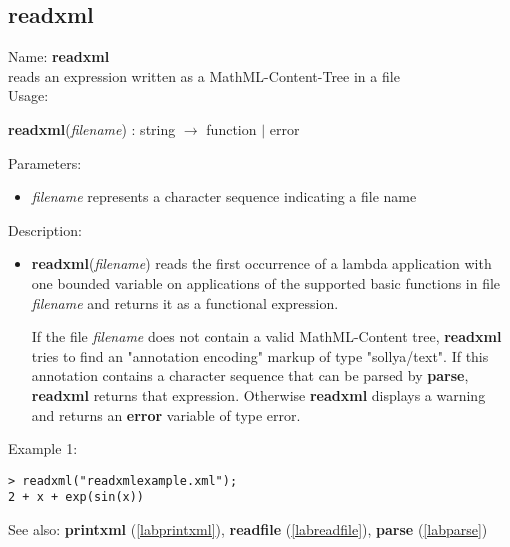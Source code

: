 \subsection{readxml}
\label{labreadxml}
\noindent Name: \textbf{readxml}\\
reads an expression written as a MathML-Content-Tree in a file\\
\noindent Usage: 
\begin{center}
\textbf{readxml}(\emph{filename}) : \textsf{string} $\rightarrow$ \textsf{function} $|$ \textsf{error}
\\ 
\end{center}
Parameters: 
\begin{itemize}
\item \emph{filename} represents a character sequence indicating a file name
\end{itemize}
\noindent Description: \begin{itemize}

\item \textbf{readxml}(\emph{filename}) reads the first occurrence of a lambda
   application with one bounded variable on applications of the supported
   basic functions in file \emph{filename} and returns it as a \sollya
   functional expression.
    
   If the file \emph{filename} does not contain a valid MathML-Content tree,
   \textbf{readxml} tries to find an "annotation encoding" markup of type
   "sollya/text". If this annotation contains a character sequence
   that can be parsed by \textbf{parse}, \textbf{readxml} returns that expression.  Otherwise
   \textbf{readxml} displays a warning and returns an \textbf{error} variable of type
   \textsf{error}.
\end{itemize}
\noindent Example 1: 
\begin{center}\begin{minipage}{15cm}\begin{Verbatim}[frame=single]
> readxml("readxmlexample.xml");
2 + x + exp(sin(x))
\end{Verbatim}
\end{minipage}\end{center}
See also: \textbf{printxml} (\ref{labprintxml}), \textbf{readfile} (\ref{labreadfile}), \textbf{parse} (\ref{labparse})
